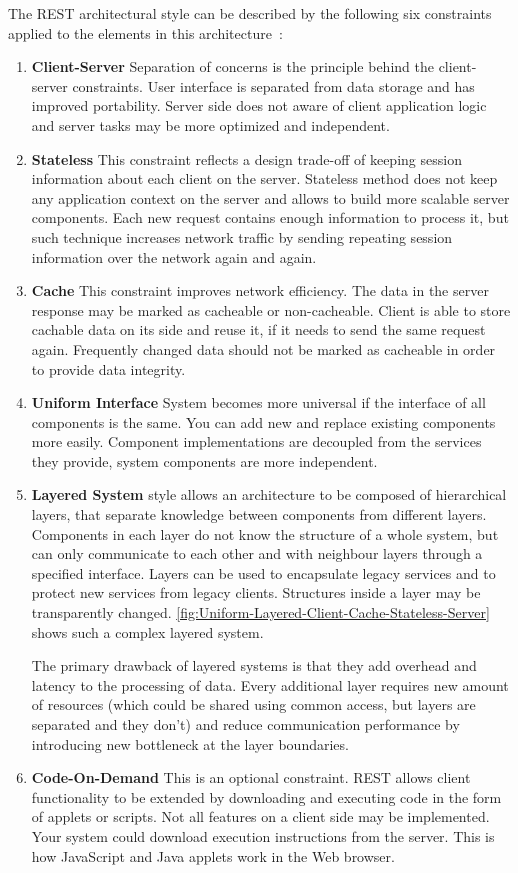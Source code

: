 The REST architectural style can be described by the following six constraints
applied to the elements in this architecture~\cite{Fielding2000}:
\begin{enumerate}
  \item \textbf{Client-Server}
  Separation of concerns is the principle behind the client-server constraints.
  User interface is separated from data storage and has improved portability.
  Server side does not aware of client application logic and server tasks may be
  more optimized and independent.
  \item \textbf{Stateless}
  This constraint reflects a design trade-off of keeping session
  information about each client on the server. Stateless method does not keep
  any application context on the server and allows to build more scalable server
  components. Each new request contains enough information to process it, but
  such technique increases network traffic by sending repeating session
  information over the network again and again.
  \item \textbf{Cache}
  This constraint improves network efficiency. The data in the server response
  may be marked as cacheable or non-cacheable. Client is able to store cachable
  data on its side and reuse it, if it needs to send the same request again.
  Frequently changed data should not be marked as cacheable in order to provide
  data integrity.
  \item \textbf{Uniform Interface}
  System becomes more universal if the interface of all components is the same.
  You can add new and replace existing components more easily. Component
  implementations are decoupled from the services they provide, system
  components are more independent. 
  \item \textbf{Layered System} style allows an architecture to be composed of hierarchical
  layers, that separate knowledge between components from different layers.
  Components in each layer do not know the structure of a whole system, but can
  only communicate to each other and with neighbour layers through a specified
  interface. Layers can be used to encapsulate legacy services and to protect
  new services from legacy clients. Structures inside a layer may be
  transparently changed.
  \autoref{fig:Uniform-Layered-Client-Cache-Stateless-Server} shows such a
  complex layered system.
  
  The primary drawback of layered systems is that they add overhead and latency
  to the processing of data. Every additional layer requires new amount of
  resources (which could be shared using common access, but layers are
  separated and they don't) and reduce communication performance by introducing
  new bottleneck at the layer boundaries.
  \item \textbf{Code-On-Demand}
  This is an optional constraint. REST allows client functionality to be extended
  by downloading and executing code in the form of applets or scripts. Not all
  features on a client side may be implemented. Your system could download
  execution instructions from the server. This is how JavaScript and Java
  applets work in the Web browser.
 
\end{enumerate}




